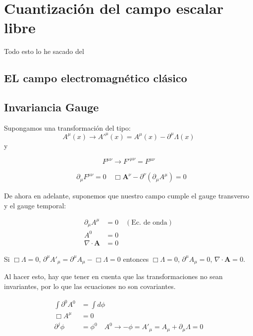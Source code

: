 \setchapterpreamble[u]{\margintoc}
\chapter{Cuantización del campo escalar libre}

\begin{center}
  \large Todo esto lo he sacado del \cite{Dobdado}
\end{center}
\section{EL campo electromagnético clásico}
\section{Invariancia Gauge}

Supongamos una transformación del tipo:
$$ A^\mu(x) \rightarrow A'^\mu(x) = A^\mu(x) - \partial^\mu \Lambda(x) $$
y

$$ F^{\mu\nu} \rightarrow F'^{\mu\nu} = F^{\mu\nu} $$

$$
\begin{align*}
    &\partial_\mu F^{\mu\nu} = 0 \quad \Box \mathbf{A}^\nu - \partial^\nu (\partial_\mu A^\mu) = 0
\end{align*}
$$

De ahora en adelante, suponemos que nuestro campo cumple el gauge transverso y el gauge temporal:

$$ 
\begin{align*}
    \partial_\mu A^\mu &= 0 \quad (\text{Ec. de onda}) \\
    A^0 &= 0 \\
    \nabla \cdot \mathbf{A} &= 0
\end{align*}
$$

Si $\Box \Lambda = 0$, $\partial^\mu A'_\mu = \partial^\mu A_\mu - \Box \Lambda = 0$ entonces $\Box \Lambda = 0$, $\partial^\mu A_\mu = 0$, $\nabla \cdot \mathbf{A} = 0$.

Al hacer esto, hay que tener en cuenta que las transformaciones no sean invariantes, por lo que las ecuaciones no son covariantes.

$$
\begin{align*}
    \int \partial^0 A^0 &= \int d \phi \\
    \Box A^\mu &= 0 \\
    \partial^j \phi &= \phi^0 \quad A^0 \rightarrow -\phi = A'_\mu = A_\mu + \partial_\mu \Lambda = 0
\end{align*}
$$

